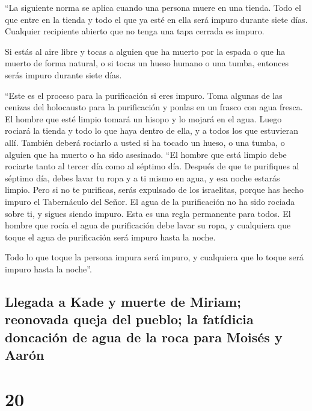  ``La siguiente norma se aplica cuando una persona muere
en una tienda. Todo el que entre en la tienda y todo el que ya esté en
ella será impuro durante siete días.  Cualquier
recipiente abierto que no tenga una tapa cerrada es impuro.

 Si estás al aire libre y tocas a alguien que ha muerto
por la espada o que ha muerto de forma natural, o si tocas un hueso
humano o una tumba, entonces serás impuro durante siete días.

 ``Este es el proceso para la purificación si eres
impuro. Toma algunas de las cenizas del holocausto para la purificación
y ponlas en un frasco con agua fresca.  El hombre que
esté limpio tomará un hisopo y lo mojará en el agua. Luego rociará la
tienda y todo lo que haya dentro de ella, y a todos los que estuvieran
allí. También deberá rociarlo a usted si ha tocado un hueso, o una
tumba, o alguien que ha muerto o ha sido asesinado.  ``El
hombre que está limpio debe rociarte tanto al tercer día como al séptimo
día. Después de que te purifiques al séptimo día, debes lavar tu ropa y
a ti mismo en agua, y esa noche estarás limpio.  Pero si
no te purificas, serás expulsado de los israelitas, porque has hecho
impuro el Tabernáculo del Señor. El agua de la purificación no ha sido
rociada sobre ti, y sigues siendo impuro.  Esta es una
regla permanente para todos. El hombre que rocía el agua de purificación
debe lavar su ropa, y cualquiera que toque el agua de purificación será
impuro hasta la noche.

 Todo lo que toque la persona impura será impuro, y
cualquiera que lo toque será impuro hasta la noche''.

\hypertarget{llegada-a-kade-y-muerte-de-miriam-reonovada-queja-del-pueblo-la-fatuxeddicia-doncaciuxf3n-de-agua-de-la-roca-para-moisuxe9s-y-aaruxf3n}{%
\subsection{Llegada a Kade y muerte de Miriam; reonovada queja del
pueblo; la fatídicia doncación de agua de la roca para Moisés y
Aarón}\label{llegada-a-kade-y-muerte-de-miriam-reonovada-queja-del-pueblo-la-fatuxeddicia-doncaciuxf3n-de-agua-de-la-roca-para-moisuxe9s-y-aaruxf3n}}

\hypertarget{section-19}{%
\section{20}\label{section-19}}


